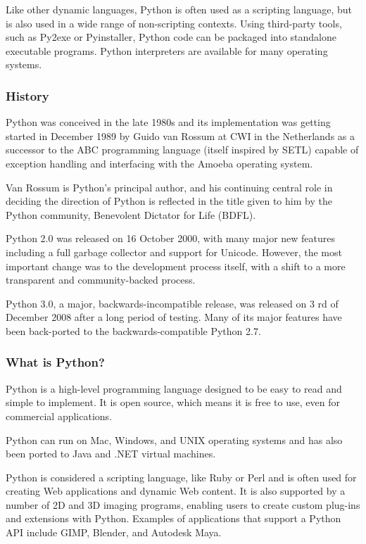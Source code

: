 Like other dynamic languages, Python is often used as a
scripting language, but is also used in a wide range of
non-scripting contexts. Using third-party tools, such as
Py2exe or Pyinstaller\cite{amjad7},
Python code can be packaged into standalone executable
programs. Python interpreters are available for many
operating systems.

\subsubsection{History}

Python was conceived in the late 1980s\cite{amjad8} and its
implementation was getting started in December 1989
\cite{amjad9} by Guido van Rossum at CWI in the Netherlands
as a successor to the ABC programming language (itself
inspired by SETL)\cite{amjad10} capable of exception
handling and interfacing with the Amoeba operating system.
\cite{amjad11}

Van Rossum is Python's principal author, and his continuing
central role in deciding the direction of Python is
reflected in the title given to him by the Python
community, Benevolent Dictator for Life (BDFL).

Python 2.0 was released on 16 October 2000, with many major
new features including a full garbage collector and support
for Unicode. However, the most important change was to the
development process itself, with a shift to a more
transparent and community-backed process.

Python 3.0, a major, backwards-incompatible release, was
released on 3 rd of December 2008\cite{amjad12}
after a long period of testing. Many of its major features
have been back-ported to the backwards-compatible Python
2.7.\cite{amjad13}

\subsubsection{What is Python?}

Python is a high-level programming language designed to be
easy to read and simple to implement. It is open source,
which means it is free to use, even for commercial
applications.

Python can run on Mac, Windows, and UNIX operating systems
and has also been ported to Java and .NET virtual machines.
\cite{amjad14}

Python is considered a scripting language, like Ruby or
Perl and is often used for creating Web applications and
dynamic Web content. It is also supported by a number of 2D
and 3D imaging programs, enabling users to create custom
plug-ins and extensions with Python. Examples of
applications that support a Python API include GIMP,
Blender, and Autodesk Maya.\cite{amjad14}

